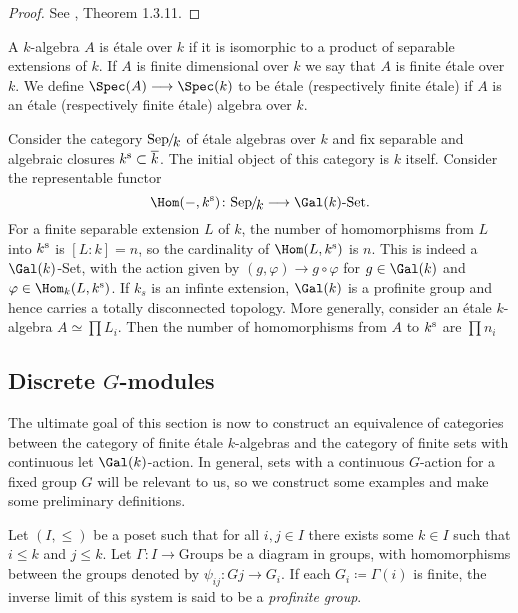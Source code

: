 \begin{proof}
	See \cite{Szamuely}, Theorem 1.3.11.
\end{proof}

\begin{definition}
	A $k$-algebra $A$ is \'etale over $k$ if it is isomorphic to a product of separable extensions of $k$. If $A$ is finite dimensional over $k$ we say that $A$ is finite \'etale over $k$. We define $\Spec(A) \to \Spec(k)$ to be \'etale (respectively finite \'etale) if $A$ is an \'etale (respectively finite \'etale) algebra over $k$.
\end{definition}

\begin{construction}\label{construction:separable_category}
	Consider the category $\Sepk$ of \'etale algebras over $k$ and fix separable and algebraic closures $k^{\text{s}} \subset \overline{k}$. The initial object of this category is $k$ itself. Consider the representable functor
	\[
		\Hom(-, k^\sep) \colon \Sepk \to \Gal(k)\text{-Set}.
	\]
	For a finite separable extension $L$ of $k$, the number of homomorphisms from $L$ into $k^{\text{s}}$ is $[L:k] = n$, so the cardinality of $\Hom(L, k^\sep)$ is $n$. This is indeed a $\Gal(k)$-Set, with the action given by $(g, \varphi) \to g \circ \varphi$ for $g \in \Gal(k)$ and $\varphi \in \Hom_k(L, k^\sep)$. If $k_s$ is an infinte extension, $\Gal(k)$ is a profinite group and hence carries a totally disconnected topology. More generally, consider an \'etale $k$-algebra $A \simeq \prod L_i$. Then the number of homomorphisms from $A$ to $k^{\text{s}}$ are $\prod n_i$
\end{construction}

\subsection{Discrete \texorpdfstring{$G$}{G}-modules}
The ultimate goal of this section is now to construct an equivalence of categories between the category of finite \'etale $k$-algebras and the category of finite sets with continuous let $\Gal(k)$-action. In general, sets with a continuous $G$-action for a fixed group $G$ will be relevant to us, so we construct some examples and make some preliminary definitions.

\begin{definition}
	Let $(I, \le)$ be a poset such that for all $i, j \in I$ there exists some $k \in I$ such that $i \le k$ and $j \le k$. Let $\Gamma \colon I \to \text{Groups}$ be a diagram in groups, with homomorphisms between the groups denoted by $\psi_{ij}: Gj \to G_i$. If each $G_i \coloneqq \Gamma(i)$ is finite, the inverse limit of this system is said to be a \textit{profinite group}.
\end{definition}

